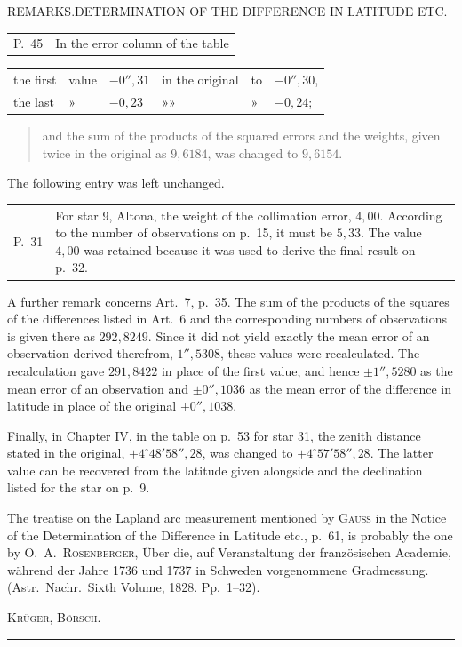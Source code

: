 \clearpage
\noindent{}\parbox{\dimexpr\linewidth-4em\relax}{\centering\small REMARKS.\quad DETERMINATION OF THE DIFFERENCE IN LATITUDE ETC.}\hfill\mbox{}\par
{\small
\par\noindent\begin{tabular}{@{}p{.065\linewidth}p{.91\linewidth}@{}}
P.\ 45&In the error column of the table
\end{tabular}
\begin{center}
\par\noindent\begin{tabular}{llllll}
the first&value&$-0''{,}31$&in the original&to&$-0''{,}30$,\\
the last&»&$-0{,}23$&»\quad »&»&$-0{,}24$;
\end{tabular}
\end{center}
\begin{quote}
and the sum of the products of the squared errors and the weights, given twice in the original
as $9{,}6184$, was changed to $9{,}6154$.
\end{quote}
The following entry was left unchanged.
\par\noindent\begin{tabular}{@{}p{.065\linewidth}p{.91\linewidth}@{}}
P.\ 31&For star 9, Altona, the weight of the collimation error, $4{,}00$. According to the number
of observations on p.\ 15, it must be $5{,}33$. The value $4{,}00$ was retained because it was used
to derive the final result on p.\ 32.
\end{tabular}

A further remark concerns Art.\ 7, p.\ 35. The sum of the products of the squares of the
differences listed in Art.\ 6 and the corresponding numbers of observations is given there as
$292{,}8249$. Since it did not yield exactly the mean error of an observation derived therefrom,
$1''{,}5308$, these values were recalculated. The recalculation gave $291{,}8422$ in place of the
first value, and hence $\pm1''{,}5280$ as the mean error of an observation and $\pm0''{,}1036$ as the
mean error of the difference in latitude in place of the original $\pm0''{,}1038$.

Finally, in Chapter IV, in the table on p.\ 53 for star 31, the zenith distance stated in the
original, $+4^\circ48'58''{,}28$, was changed to $+4^\circ57'58''{,}28$. The latter value can be
recovered from the latitude given alongside and the declination listed for the star on p.\ 9.

The treatise on the Lapland arc measurement mentioned by \textsc{Gauss} in the Notice of the
Determination of the Difference in Latitude etc., p.\ 61, is probably the one by
O.\ A.\ \textsc{Rosenberger}, Über die, auf Veranstaltung der französischen Academie, während der
Jahre 1736 und 1737 in Schweden vorgenommene Gradmessung. (Astr.\ Nachr.\ Sixth Volume, 1828.
Pp.\ 1--32).
\par\hfill\textsc{Krüger, Börsch.}\par
}
\begin{center}\rule{.25\textwidth}{.4pt}\end{center}

